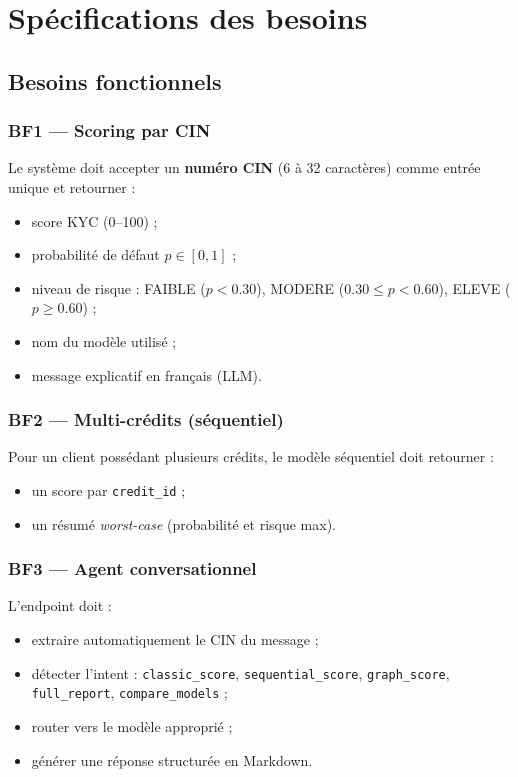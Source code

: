 \chapter{Spécifications des besoins}
\label{ch:besoins}

\section{Besoins fonctionnels}

\subsection{BF1 — Scoring par CIN}

Le système doit accepter un \textbf{numéro CIN} (6 à 32 caractères) comme entrée unique et retourner :
\begin{itemize}[leftmargin=*]
  \item score KYC (0--100) ;
  \item probabilité de défaut $p \in [0,1]$ ;
  \item niveau de risque : FAIBLE ($p < 0.30$), MODERE ($0.30 \leq p < 0.60$), ELEVE ($p \geq 0.60$) ;
  \item nom du modèle utilisé ;
  \item message explicatif en français (LLM).
\end{itemize}

\subsection{BF2 — Multi-crédits (séquentiel)}

Pour un client possédant plusieurs crédits, le modèle séquentiel doit retourner :
\begin{itemize}[leftmargin=*]
  \item un score par \texttt{credit\_id} ;
  \item un résumé \textit{worst-case} (probabilité et risque max).
\end{itemize}

\subsection{BF3 — Agent conversationnel}

L'endpoint  doit :
\begin{itemize}[leftmargin=*]
  \item extraire automatiquement le CIN du message ;
  \item détecter l'intent : \texttt{classic\_score}, \texttt{sequential\_score}, \texttt{graph\_score}, \texttt{full\_report}, \texttt{compare\_models} ;
  \item router vers le modèle approprié ;
  \item générer une réponse structurée en Markdown.
\end{itemize}

